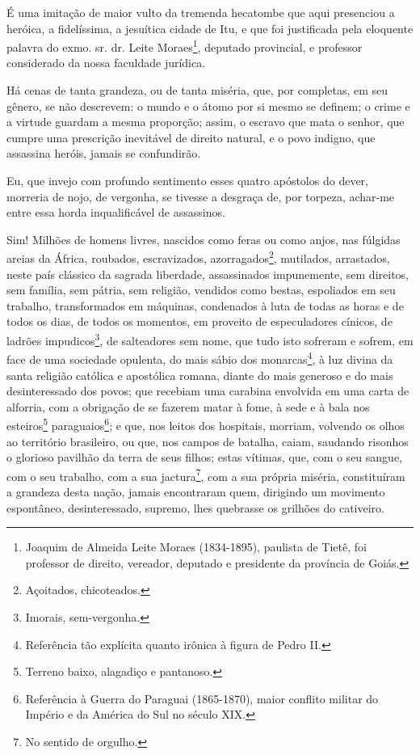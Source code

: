 É uma imitação de maior vulto da tremenda hecatombe que aqui presenciou
a heróica, a fidelíssima, a jesuítica cidade de Itu, e que foi
justificada pela eloquente palavra do exmo. sr. dr. Leite
Moraes\footnote{Joaquim de Almeida Leite Moraes (1834-1895), paulista
  de Tietê, foi professor de direito, vereador, deputado e presidente da
  província de Goiás.}, deputado provincial, e professor considerado da
nossa faculdade jurídica.

Há cenas de tanta grandeza, ou de tanta miséria, que, por completas, em
seu gênero, se não descrevem: o mundo e o átomo por si mesmo se definem;
o crime e a virtude guardam a mesma proporção; assim, o escravo que mata
o senhor, que cumpre uma prescrição inevitável de direito natural, e o
povo indigno, que assassina heróis, jamais se confundirão.

Eu, que invejo com profundo sentimento esses quatro apóstolos do dever,
morreria de nojo, de vergonha, se tivesse a desgraça de, por torpeza,
achar-me entre essa horda inqualificável de assassinos.

Sim! Milhões de homens livres, nascidos como feras ou como anjos, nas
fúlgidas areias da África, roubados, escravizados, azorragados\footnote{
  Açoitados, chicoteados.}, mutilados, arrastados, neste país clássico
da sagrada liberdade, assassinados impunemente, sem direitos, sem
família, sem pátria, sem religião, vendidos como bestas, espoliados em
seu trabalho, transformados em máquinas, condenados à luta de todas as
horas e de todos os dias, de todos os momentos, em proveito de
especuladores cínicos, de ladrões impudicos\footnote{Imorais,
  sem-vergonha.}, de salteadores sem nome, que tudo isto sofreram e
sofrem, em face de uma sociedade opulenta, do mais sábio dos
monarcas\footnote{Referência tão explícita quanto irônica à figura de
  Pedro II.}, à luz divina da santa religião católica e apostólica
romana, diante do mais generoso e do mais desinteressado dos povos; que
recebiam uma carabina envolvida em uma carta de alforria, com a
obrigação de se fazerem matar à fome, à sede e à bala nos
esteiros\footnote{Terreno baixo, alagadiço e pantanoso.}
paraguaios\footnote{Referência à Guerra do Paraguai (1865-1870), maior
  conflito militar do Império e da América do Sul no século XIX.}; e
que, nos leitos dos hospitais, morriam, volvendo os olhos ao território
brasileiro, ou que, nos campos de batalha, caiam, saudando risonhos o
glorioso pavilhão da terra de seus filhos; estas vítimas, que, com o seu
sangue, com o seu trabalho, com a sua jactura\footnote{No sentido de
  orgulho.}, com a sua própria miséria, constituíram a grandeza desta
nação, jamais encontraram quem, dirigindo um movimento espontâneo,
desinteressado, supremo, lhes quebrasse os grilhões do cativeiro.

